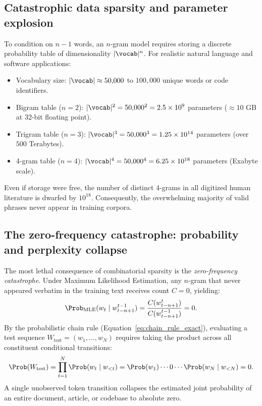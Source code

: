 \documentclass[../../main.tex]{subfiles}
\begin{document}
\subsection{Catastrophic data sparsity and parameter explosion}
To condition on $n-1$ words, an $n$-gram model requires storing a discrete probability table of dimensionality $|\vocab|^n$. For realistic natural language and software applications:
\begin{itemize}
    \item Vocabulary size: $|\vocab| \approx 50{,}000$ to $100{,}000$ unique words or code identifiers.
    \item Bigram table ($n=2$): $|\vocab|^2 = 50{,}000^2 = 2.5 \times 10^9$ parameters ($\approx 10$ GB at 32-bit floating point).
    \item Trigram table ($n=3$): $|\vocab|^3 = 50{,}000^3 = 1.25 \times 10^{14}$ parameters (over $500$ Terabytes).
    \item 4-gram table ($n=4$): $|\vocab|^4 = 50{,}000^4 = 6.25 \times 10^{18}$ parameters (Exabyte scale).
\end{itemize}
Even if storage were free, the number of distinct 4-grams in all digitized human literature is dwarfed by $10^{18}$. Consequently, the overwhelming majority of valid phrases never appear in training corpora.

\subsection{The zero-frequency catastrophe: probability and perplexity collapse}
\label{subsec:zero_freq_collapse}
The most lethal consequence of combinatorial sparsity is the \emph{zero-frequency catastrophe}. Under Maximum Likelihood Estimation, any $n$-gram that never appeared verbatim in the training text receives count $C = 0$, yielding:
\begin{equation}
\label{eq:zero_mle}
\Prob_{\text{MLE}}(w_t \mid w_{t-n+1}^{t-1}) = \frac{C(w_{t-n+1}^t)}{C(w_{t-n+1}^{t-1})} = 0.
\end{equation}
By the probabilistic chain rule (Equation~\eqref{eq:chain_rule_exact}), evaluating a test sequence $W_{\text{test}} = (w_1, \dots, w_N)$ requires taking the product across all constituent conditional transitions:
\begin{equation}
\label{eq:chain_rule_zero_collapse}
\Prob(W_{\text{test}}) = \prod_{t=1}^N \Prob(w_t \mid w_{<t}) = \Prob(w_1) \cdots 0 \cdots \Prob(w_N \mid w_{<N}) = 0.
\end{equation}
A single unobserved token transition collapses the estimated joint probability of an entire document, article, or codebase to absolute zero.
\end{document}
